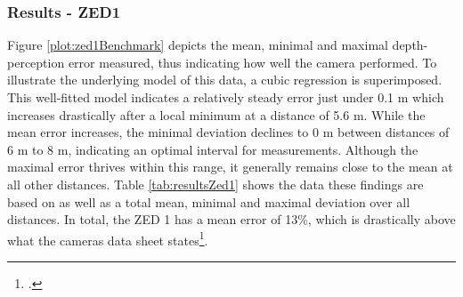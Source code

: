 \subsubsection{Results - ZED1}

Figure \ref{plot:zed1Benchmark} depicts the mean, minimal and maximal depth-perception error measured, thus indicating how well the camera performed.
To illustrate the underlying model of this data, a cubic regression is superimposed. This well-fitted model indicates a relatively steady error just under 0.1 m which increases drastically after a local minimum at a distance of 5.6 m. 
While the mean error increases, the minimal deviation declines to 0 m between distances of 6 m to 8 m, indicating an optimal interval for measurements. Although the maximal error thrives within this range, it generally remains close to the mean at all other distances.
Table \ref{tab:resultsZed1} shows the data these findings are based on as well as a total mean, minimal and maximal deviation over all distances. 
In total, the ZED 1 has a mean error of 13\%, which is drastically above what the cameras data sheet states\footcite{zed1Datasheet}.

%
%



